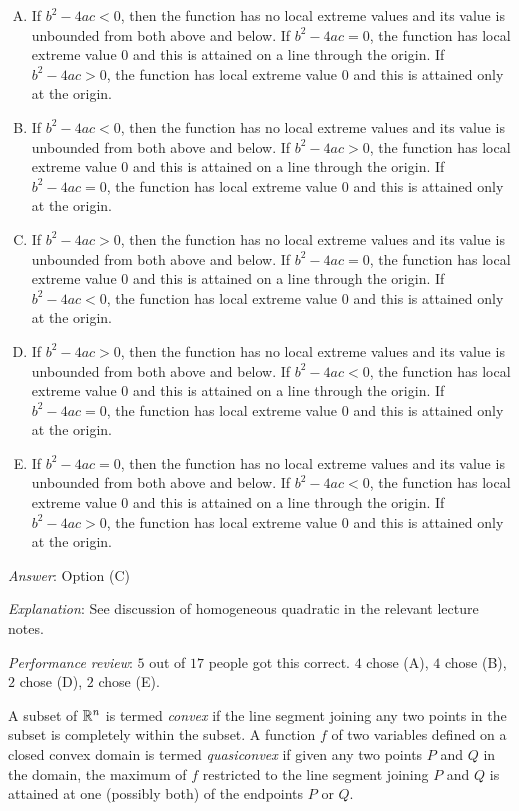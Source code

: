 \documentclass[10pt]{amsart}
\begin{document}
\begin{enumerate}
  \begin{enumerate}[(A)]
  \item If $b^2 - 4ac < 0$, then the function has no local extreme
    values and its value is unbounded from both above and below. If
    $b^2 - 4ac = 0$, the function has local extreme value $0$ and this
    is attained on a line through the origin. If $b^2 - 4ac > 0$, the
    function has local extreme value $0$ and this is attained only at
    the origin.
  \item If $b^2 - 4ac < 0$, then the function has no local extreme
    values and its value is unbounded from both above and below. If
    $b^2 - 4ac > 0$, the function has local extreme value $0$ and this
    is attained on a line through the origin. If $b^2 - 4ac = 0$, the
    function has local extreme value $0$ and this is attained only at
    the origin.
   \item If $b^2 - 4ac > 0$, then the function has no local extreme
    values and its value is unbounded from both above and below. If
    $b^2 - 4ac = 0$, the function has local extreme value $0$ and this
    is attained on a line through the origin. If $b^2 - 4ac < 0$, the
    function has local extreme value $0$ and this is attained only at
    the origin.
  \item If $b^2 - 4ac > 0$, then the function has no local extreme
    values and its value is unbounded from both above and below. If
    $b^2 - 4ac < 0$, the function has local extreme value $0$ and this
    is attained on a line through the origin. If $b^2 - 4ac = 0$, the
    function has local extreme value $0$ and this is attained only at
    the origin.
  \item If $b^2 - 4ac = 0$, then the function has no local extreme
    values and its value is unbounded from both above and below. If
    $b^2 - 4ac < 0$, the function has local extreme value $0$ and this
    is attained on a line through the origin. If $b^2 - 4ac > 0$, the
    function has local extreme value $0$ and this is attained only at
    the origin.
  \end{enumerate}

  {\em Answer}: Option (C)

  {\em Explanation}: See discussion of homogeneous quadratic in the
  relevant lecture notes.

  {\em Performance review}: $5$ out of $17$ people got this
  correct. $4$ chose (A), $4$ chose (B), $2$ chose (D), $2$ chose (E).

  A subset of $\mathbb{R}^n$ is termed {\em convex} if the line segment
  joining any two points in the subset is completely within the
  subset. A function $f$ of two variables defined on a closed convex
  domain is termed {\em quasiconvex} if given any two points $P$ and
  $Q$ in the domain, the maximum of $f$ restricted to the line segment
  joining $P$ and $Q$ is attained at one (possibly both) of the
  endpoints $P$ or $Q$.


\end{enumerate}
\end{document}
